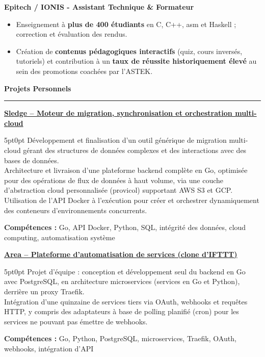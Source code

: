 \documentclass[9pt]{extarticle}
\begin{document}
\par\vspace{5pt}

{\bfseries Epitech / IONIS - Assistant Technique \& Formateur}
\begin{itemize}[noitemsep, topsep=0pt]
	\item Enseignement à {\bfseries plus de 400 étudiants} en C, C++, asm et Haskell ; correction et évaluation des rendus.
	\item Création de {\bfseries contenus pédagogiques interactifs} (quiz, cours inversés, tutoriels) et contribution à un {\bfseries taux de réussite historiquement élevé} au sein des promotions coachées par l'ASTEK.
\end{itemize}

\par\vspace{5pt}


{\large\bfseries Projets Personnels}
\par\vspace{-8pt}
\rule{\linewidth}{0.4pt}
\par\vspace{5pt}

\underline{\bfseries Sledge -- Moteur de migration, synchronisation et orchestration multi-cloud}
\par
\begin{adjustwidth}{5pt}{0pt}
    Développement et finalisation d'un outil générique de migration multi-cloud gérant des structures de données complexes et des interactions avec des bases de données. \\
    Architecture et livraison d'une plateforme backend complète en Go, optimisée pour des opérations de flux de données à haut volume, via une couche d'abstraction cloud personnalisée ({\ttfamily provicol}) supportant AWS S3 et GCP. \\
    Utilisation de l'API Docker à l'exécution pour créer et orchestrer dynamiquement des conteneurs d'environnements concurrents.
\end{adjustwidth}
\par
{\bfseries Compétences :} Go, API Docker, Python, SQL, intégrité des données, cloud computing, automatisation système

\par\vspace{8pt}

\underline{\bfseries Area -- Plateforme d'automatisation de services (clone d'IFTTT)}
\par
\begin{adjustwidth}{5pt}{0pt}
    Projet d'équipe : conception et développement seul du backend en Go avec PostgreSQL, en architecture microservices (services en Go et Python), derrière un proxy Traefik. \\
    Intégration d'une quinzaine de services tiers via OAuth, webhooks et requêtes HTTP, y compris des adaptateurs à base de polling planifié (cron) pour les services ne pouvant pas émettre de webhooks.
\end{adjustwidth}
\par
{\bfseries Compétences :} Go, Python, PostgreSQL, microservices, Traefik, OAuth, webhooks, intégration d'API
\end{document}
